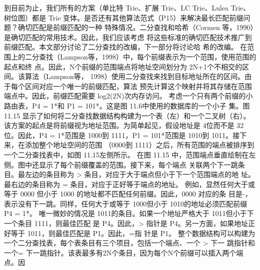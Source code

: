 到目前为止，我们所有的方案（单比特 Trie、扩展 Trie、LC Trie、Lulea Trie、树位图）都是
Trie 变体。是否还有其他算法范式（P15）来解决最长匹配前缀问题？确切匹配是前缀匹配的一种
特殊情况。二分查找和哈希（Cormen 等，1990）是确切匹配的常用技术。因此，我们应该考虑
将这些标准的确切匹配技术推广到前缀匹配。本文部分讨论了二分查找的改编，下一部分将讨论哈
希的改编。
在范围上的二分查找（Lampson等，1998）中，每个前缀表示为一个范围，使用范围的起点和终
点。因此，N个前缀的范围端点将地址空间划分为 2N+1个不相交的区间。该算法（Lampson等，
1998）使用二分查找来找到目标地址所在的区间。由于每个区间对应一个唯一的前缀匹配，算法
预先计算这个映射并将其存储在范围端点中。因此，前缀匹配需要 log2(2N)次内存访问。
考虑一个只有两个前缀的小路由表，P4 = 1*和 P1 = 101*。这是图 11.6中使用的数据库的一个小子
集。图 11.15 显示了如何将二分查找数据结构构建为一个表（左）和一个二叉树（右）。
该方案的起点是将前缀视为地址范围。为简单起见，假设地址是 4位而不是 32位。因此，P4
= 1*范围是 1000到 1111，P1 = 101*范围是 1010到 1011。接下来，在添加整个地址空间的范围
（0000到 1111）之后，所有范围的端点被排序到一个二分查找表中，如图 11.15左侧所示。
在图 11.15 中，范围端点垂直绘制在左侧。图中还显示了每个前缀覆盖的范围。接下来，每个端点
关联两个下一跳条目。最左边的条目称为 > 条目，对应于大于端点但小于下一个范围端点的地
址。最右边的条目称为 = 条目，对应于正好等于端点的地址。
例如，显然任何大于或等于 0000 但小于 1000 的地址都不匹配任何前缀。因此，0000 对应的条
目是-，表示没有下一跳。同样，任何大于或等于 1000但小于 1010的地址必须匹配前缀 P4 =
1*。
唯一微妙的情况是 1011的条目。如果一个地址严格大于 1011但小于下一个条目 1111，则最佳匹配
是 P4。因此，> 指针是 P4。另一方面，如果地址正好等于 1011，则最佳匹配是 P1。因此，=指
针是 P1。
整个数据结构可以构建为一个二分查找表，每个表条目有三个项目，包括一个端点、一个 > 下一
跳指针和一个= 下一跳指针。该表最多有2N个条目，因为每个N个前缀可以插入两个端点。因


